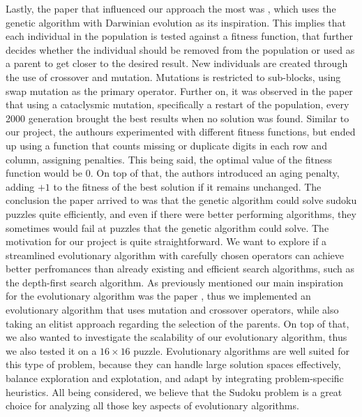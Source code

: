 {\newline Lastly, the paper that influenced our approach the most was \cite{Mantere2007}, which uses the genetic algorithm with Darwinian evolution as its inspiration. This implies that each individual in the population is tested against a fitness function, that further decides whether the individual should be removed from the population or used as a parent to get closer to the desired result.
New individuals are created through the use of crossover and mutation. Mutations is restricted to sub-blocks, using swap mutation as the primary operator. Further on, it was observed in the paper that using a cataclysmic mutation, specifically a restart of the population, every 2000 generation brought the best results when no solution was found. Similar to our project, the authours experimented with different fitness functions, but ended up using a function that counts missing or duplicate digits in each row and column, assigning penalties. This being said, the optimal value of the fitness function would be 0. On top of that, the authors introduced an aging penalty, adding $+1$ to the fitness of the best solution if it remains unchanged.
The conclusion the paper arrived to was that the genetic algorithm could solve sudoku puzzles quite efficiently, and even if there were better performing algorithms, they sometimes would fail at puzzles that the genetic algorithm could solve.}
{\newline}
{\newline The motivation for our project is quite straightforward. We want to explore if a streamlined evolutionary algorithm with carefully chosen operators can achieve better perfromances than already existing and efficient search algorithms, such as the depth-first search algorithm. As previously mentioned our main inspiration for the evolutionary algorithm was the paper \cite{Mantere2007}, thus we implemented an evolutionary algorithm that uses mutation and crossover operators, while also taking an elitist approach regarding the selection of the parents.
On top of that, we also wanted to investigate the scalability of our evolutionary algorithm, thus we also tested it on a $16 \times 16$ puzzle. Evolutionary algorithms are well suited for this type of problem, because they can handle large solution spaces effectively, balance exploration and explotation, and adapt by integrating problem-specific heuristics.
All being considered, we believe that the Sudoku problem is a great choice for analyzing all those key aspects of evolutionary algorithms.}


